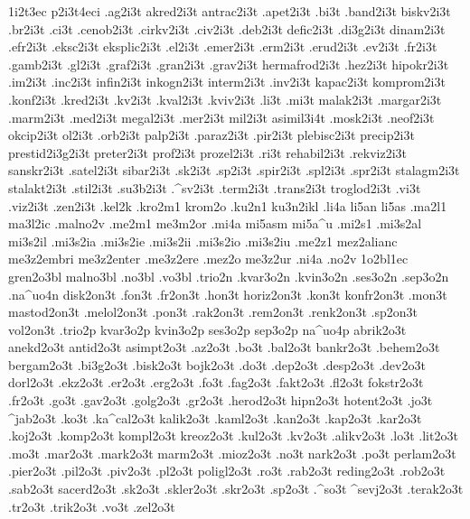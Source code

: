 {%
 1i2t3ec p2i3t4eci
%
.ag2i3t akred2i3t antrac2i3t .apet2i3t .bi3t .band2i3t biskv2i3t
.br2i3t .ci3t .cenob2i3t .cirkv2i3t .civ2i3t .deb2i3t defic2i3t .di3g2i3t
dinam2i3t .efr2i3t .eksc2i3t eksplic2i3t .el2i3t .emer2i3t .erm2i3t
.erud2i3t .ev2i3t .fr2i3t .gamb2i3t .gl2i3t .graf2i3t .gran2i3t
.grav2i3t hermafrod2i3t .hez2i3t hipokr2i3t .im2i3t .inc2i3t
infin2i3t inkogn2i3t interm2i3t .inv2i3t kapac2i3t komprom2i3t
.konf2i3t .kred2i3t .kv2i3t .kval2i3t .kviv2i3t .li3t .mi3t
malak2i3t .margar2i3t .marm2i3t .med2i3t megal2i3t .mer2i3t
mil2i3t asimil3i4t
.mosk2i3t .neof2i3t okcip2i3t ol2i3t .orb2i3t palp2i3t .paraz2i3t
.pir2i3t plebisc2i3t precip2i3t prestid2i3g2i3t preter2i3t prof2i3t
prozel2i3t .ri3t rehabil2i3t .rekviz2i3t sanskr2i3t .satel2i3t
sibar2i3t .sk2i3t .sp2i3t .spir2i3t .spl2i3t .spr2i3t stalagm2i3t
stalakt2i3t .stil2i3t .su3b2i3t .^sv2i3t .term2i3t .trans2i3t
troglod2i3t .vi3t .viz2i3t .zen2i3t
.kel2k
.kro2m1  krom2o %
.ku2n1
ku3n2ikl
.li4a
li5an li5as
.ma2l1 ma3l2ic
.malno2v
.me2m1 me3m2or
.mi4a
mi5asm mi5a^u
.mi2s1
.mi3s2al mi3s2il .mi3s2ia .mi3s2ie .mi3s2ii .mi3s2io .mi3s2iu
.me2z1
mez2alianc me3z2embri me3z2enter .me3z2ere .mez2o me3z2ur
.ni4a
.no2v
 1o2bl1ec
gren2o3bl malno3bl .no3bl .vo3bl
.trio2n .kvar3o2n .kvin3o2n .ses3o2n .sep3o2n  .na^uo4n
  
disk2on3t .fon3t .fr2on3t .hon3t horiz2on3t .kon3t konfr2on3t
.mon3t mastod2on3t .melol2on3t .pon3t .rak2on3t .rem2on3t .renk2on3t
.sp2on3t vol2on3t
 .trio2p kvar3o2p kvin3o2p ses3o2p sep3o2p
 na^uo4p   
abrik2o3t anekd2o3t antid2o3t asimpt2o3t .az2o3t .bo3t .bal2o3t
bankr2o3t .behem2o3t bergam2o3t .bi3g2o3t .bisk2o3t bojk2o3t .do3t
.dep2o3t .desp2o3t .dev2o3t dorl2o3t .ekz2o3t .er2o3t .erg2o3t .fo3t
.fag2o3t .fakt2o3t .fl2o3t fokstr2o3t .fr2o3t .go3t .gav2o3t
.golg2o3t .gr2o3t .herod2o3t hipn2o3t hotent2o3t .jo3t ^jab2o3t
.ko3t .ka^cal2o3t kalik2o3t .kaml2o3t .kan2o3t .kap2o3t .kar2o3t
.koj2o3t .komp2o3t kompl2o3t kreoz2o3t .kul2o3t .kv2o3t .alikv2o3t
.lo3t .lit2o3t .mo3t .mar2o3t .mark2o3t marm2o3t .mioz2o3t .no3t
nark2o3t .po3t perlam2o3t .pier2o3t .pil2o3t .piv2o3t .pl2o3t
poligl2o3t .ro3t .rab2o3t reding2o3t .rob2o3t .sab2o3t sacerd2o3t
.sk2o3t .skler2o3t .skr2o3t .sp2o3t .^so3t ^sevj2o3t .terak2o3t
.tr2o3t .trik2o3t .vo3t .zel2o3t
}
